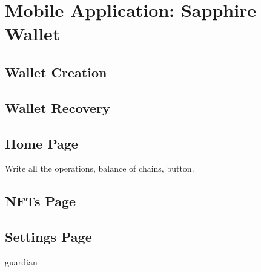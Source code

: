 \section{Mobile Application: Sapphire Wallet}
\label{sec:mobile_application}

\subsection{Wallet Creation}
\label{subsec:wallet_creation}

\subsection{Wallet Recovery}
\label{subsec:wallet_recovery}

\subsection{Home Page}
\label{subsec:wallet_home_page}

Write all the operations, balance of chains, button.

\subsection{NFTs Page}
\label{subsec:nfts_page}

\subsection{Settings Page}
\label{subsec:settings_page}

guardian
